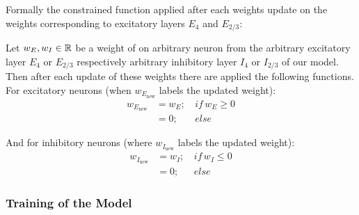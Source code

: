 Formally the constrained function applied after each weights update on the weights corresponding to excitatory layers $E_4$ and $E_{2/3}$:

\begin{defn}
    Let $w_E, w_I \in \mathbb{R}$ be a weight of on arbitrary neuron from the arbitrary excitatory layer $E_4$ or $E_{2/3}$ respectively arbitrary inhibitory layer $I_4$ or $I_{2/3}$  of our model. Then after each update of these weights there are applied the following functions. For excitatory neurons (when $w_{E_{\text{new}}}$ labels the updated weight):
    \begin{align*}
        w_{E_{\text{new}}} &= w_{E};\, &if\, w_E \geq 0 \\
        &= 0;\, &else 
    \end{align*}
    
    And for inhibitory neurons (where $w_{I_{\text{new}}}$ labels the updated weight):
    \begin{align*}
        w_{I_{\text{new}}} &= w_{I};\, &if\, w_I \leq 0 \\
        &= 0;\, &else 
    \end{align*}
\end{defn}


\subsubsection{Training of the Model}
\label{subsubsec:training_model}

